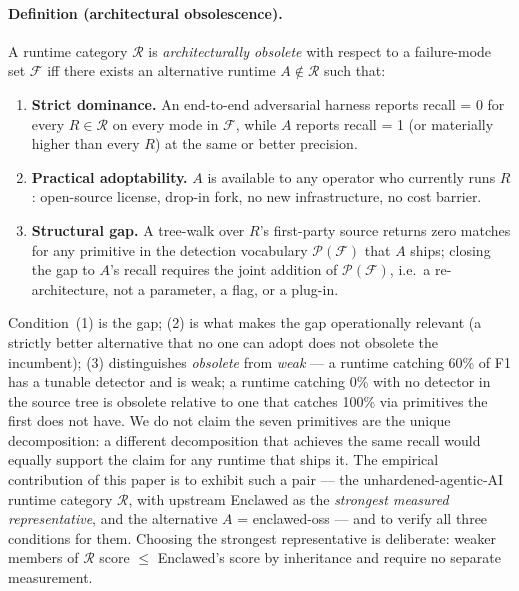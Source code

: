 \documentclass[11pt]{article}
\begin{document}
\paragraph{Definition (architectural obsolescence).}
\label{sec:def-obsolescence}
A runtime category $\mathcal{R}$ is \emph{architecturally obsolete}
with respect to a failure-mode set $\mathcal{F}$ iff there exists
an alternative runtime $A \notin \mathcal{R}$ such that:
\begin{enumerate}
  \item \textbf{Strict dominance.} An end-to-end adversarial
    harness reports recall = 0 for every $R \in \mathcal{R}$ on
    every mode in $\mathcal{F}$, while $A$ reports recall = 1 (or
    materially higher than every $R$) at the same or better
    precision.
  \item \textbf{Practical adoptability.} $A$ is available to any
    operator who currently runs $R$: open-source license,
    drop-in fork, no new infrastructure, no cost barrier.
  \item \textbf{Structural gap.} A tree-walk over $R$'s first-party
    source returns zero matches for any primitive in the detection
    vocabulary $\mathcal{P}(\mathcal{F})$ that $A$ ships; closing
    the gap to $A$'s recall requires the joint addition of
    $\mathcal{P}(\mathcal{F})$, i.e.\ a re-architecture, not a
    parameter, a flag, or a plug-in.
\end{enumerate}
Condition~(1) is the gap; (2) is what makes the gap operationally
relevant (a strictly better alternative that no one can adopt does
not obsolete the incumbent); (3) distinguishes \emph{obsolete} from
\emph{weak} --- a runtime catching 60\% of F1 has a tunable detector
and is weak; a runtime catching 0\% with no detector in the source
tree is obsolete relative to one that catches 100\% via primitives
the first does not have. We do not claim the seven primitives are
the unique decomposition: a different decomposition that achieves
the same recall would equally support the claim for any runtime
that ships it. The empirical contribution of this paper is to
exhibit such a pair --- the unhardened-agentic-AI runtime category
$\mathcal{R}$, with upstream Enclawed as the \emph{strongest
measured representative}, and the alternative $A$ = enclawed-oss
--- and to verify all three conditions for them. Choosing the
strongest representative is deliberate: weaker members of
$\mathcal{R}$ score $\leq$ Enclawed's score by inheritance and
require no separate measurement.
\end{document}
